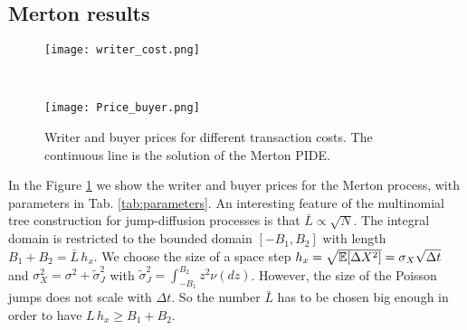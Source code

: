 \subsection{Merton results}

\begin{figure}[t!]
 \begin{minipage}[b]{0.5\linewidth}
   \centering
   \texttt{[image: writer\_cost.png]}
 \end{minipage}
 \ \hspace{2mm} \hspace{3mm} \
 \begin{minipage}[b]{0.5\linewidth}
  \centering
   \texttt{[image: Price\_buyer.png]}
 \end{minipage}
 \caption{Writer and buyer prices for different transaction costs. The continuous line is the solution of the Merton PIDE.}
   \label{Fig3}
\end{figure}
In the Figure \ref{Fig3} we show the writer and buyer prices for the Merton process, with parameters in Tab. \ref{tab:parameters}.
An interesting feature of the multinomial tree construction for jump-diffusion processes is that $\bar L \propto \sqrt{N}$.
The integral domain is restricted to the bounded domain $[-B_1,B_2]$ with length $B_1+B_2 = \bar L \, h_x$. 
We choose the size of a space step $h_x = \sqrt{\mathbb{E}[\Delta X^2]} = \sigma_X \sqrt{\Delta t}$ and $\sigma_X^2 = \sigma^2 + \tilde \sigma_J^2$ 
with $ \tilde \sigma_J^2 = \int_{-B_1}^{B_2} z^2 \nu(dz)$.
However, the size of the Poisson jumps does not scale with $\Delta t$. So the number $\bar L$ has to be chosen big enough in order 
to have $L\, h_x \geq B_1+B_2$. 

